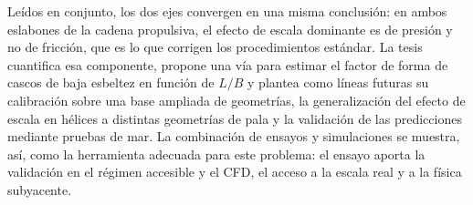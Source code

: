 \begin{ResumenPlantilla}
Leídos en conjunto, los dos ejes convergen en una misma conclusión: en ambos
eslabones de la cadena propulsiva, el efecto de escala dominante es de presión y
no de fricción, que es lo que corrigen los procedimientos estándar. La tesis
cuantifica esa componente, propone una vía para estimar el factor de forma de
cascos de baja esbeltez en función de $L/B$ y plantea como líneas futuras su
calibración sobre una base ampliada de geometrías, la generalización del efecto
de escala en hélices a distintas geometrías de pala y la validación de las
predicciones mediante pruebas de mar. La combinación de ensayos y simulaciones
se muestra, así, como la herramienta adecuada para este problema: el ensayo
aporta la validación en el régimen accesible y el CFD, el acceso a la escala
real y a la física subyacente.
\end{ResumenPlantilla}

